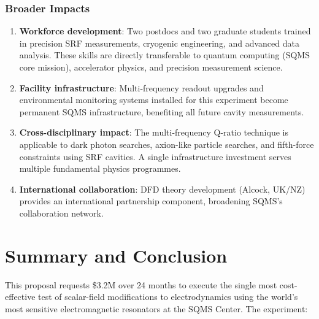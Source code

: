 \documentclass[11pt]{article}
\begin{document}
\section{Broader Impacts}
\label{sec:broader}

\begin{enumerate}
\item \textbf{Workforce development}: Two postdocs and two graduate
  students trained in precision SRF measurements, cryogenic engineering,
  and advanced data analysis. These skills are directly transferable to
  quantum computing (SQMS core mission), accelerator physics, and
  precision measurement science.

\item \textbf{Facility infrastructure}: Multi-frequency readout upgrades
  and environmental monitoring systems installed for this experiment
  become permanent SQMS infrastructure, benefiting all future cavity
  measurements.

\item \textbf{Cross-disciplinary impact}: The multi-frequency Q-ratio
  technique is applicable to dark photon searches, axion-like particle
  searches, and fifth-force constraints using SRF cavities. A single
  infrastructure investment serves multiple fundamental physics
  programmes.

\item \textbf{International collaboration}: DFD theory development
  (Alcock, UK/NZ) provides an international partnership component,
  broadening SQMS's collaboration network.
\end{enumerate}


\part{Summary and Conclusion}

This proposal requests \$3.2M over 24 months to execute the single most
cost-effective test of scalar-field modifications to electrodynamics
using the world's most sensitive electromagnetic resonators at the SQMS
Center. The experiment:
\end{document}
